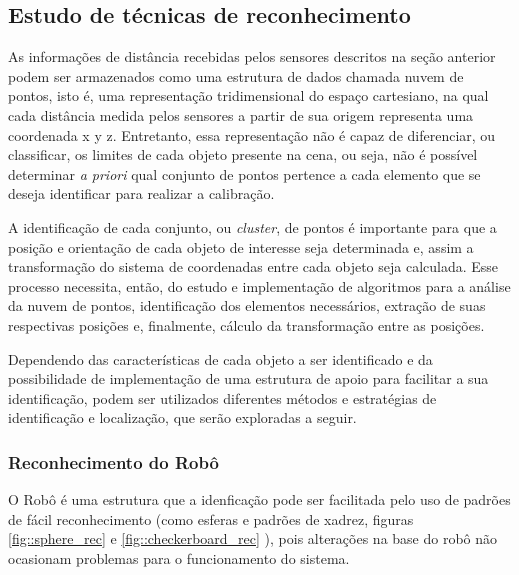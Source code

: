 \subsection{Estudo de técnicas de reconhecimento} 

As informações de distância recebidas pelos sensores descritos na seção
anterior podem ser armazenados como uma estrutura de dados chamada nuvem de
pontos, isto é, uma representação tridimensional do espaço cartesiano, na qual cada distância medida pelos
sensores a partir de sua origem representa uma coordenada x y z.
Entretanto, essa representação não é capaz de diferenciar, ou classificar, os
limites de cada objeto presente na cena, ou seja, não é possível determinar
\textit{a priori} qual conjunto de pontos pertence a cada elemento que se deseja
identificar para realizar a calibração.

A identificação de cada conjunto, ou \textit{cluster}, de pontos é importante
para que a posição e orientação de cada objeto de interesse seja determinada e,
assim a transformação do sistema de coordenadas entre cada objeto seja
calculada. Esse processo necessita, então, do estudo e implementação de
algoritmos para a análise da nuvem de pontos, identificação dos elementos
necessários, extração de suas respectivas posições e, finalmente, cálculo da
transformação entre as posições. 

Dependendo das características de cada objeto a ser identificado e da
possibilidade de implementação de uma estrutura de apoio para facilitar a sua
identificação, podem ser utilizados diferentes métodos e estratégias de
identificação e localização, que serão exploradas a seguir.

\subsubsection{Reconhecimento do Robô}

O Robô é uma estrutura que a idenficação pode ser facilitada pelo uso de
padrões de fácil reconhecimento (como esferas e padrões de xadrez, figuras
\ref{fig::sphere_rec} e \ref{fig::checkerboard_rec} ), pois alterações na base
do robô não ocasionam problemas para o funcionamento do sistema.



